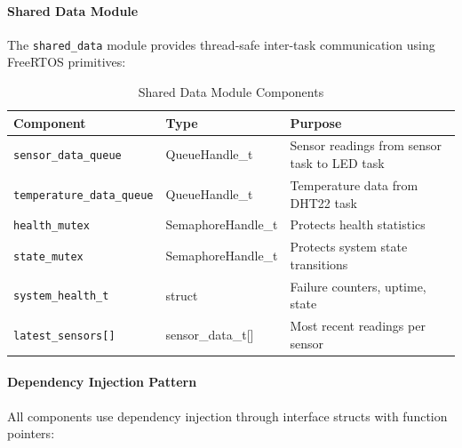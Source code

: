\paragraph{Shared Data Module}

The \texttt{shared\_data} module provides thread-safe inter-task communication using FreeRTOS primitives:

\begin{table}[H]
\centering
\caption{Shared Data Module Components}
\footnotesize
\begin{tabular}{@{}llp{6cm}@{}}
\toprule
\textbf{Component} & \textbf{Type} & \textbf{Purpose} \\
\midrule
\texttt{sensor\_data\_queue} & QueueHandle\_t & Sensor readings from sensor task to LED task \\
\texttt{temperature\_data\_queue} & QueueHandle\_t & Temperature data from DHT22 task \\
\texttt{health\_mutex} & SemaphoreHandle\_t & Protects health statistics \\
\texttt{state\_mutex} & SemaphoreHandle\_t & Protects system state transitions \\
\texttt{system\_health\_t} & struct & Failure counters, uptime, state \\
\texttt{latest\_sensors[]} & sensor\_data\_t[] & Most recent readings per sensor \\
\bottomrule
\end{tabular}
\end{table}

\paragraph{Dependency Injection Pattern}

All components use dependency injection through interface structs with function pointers:

